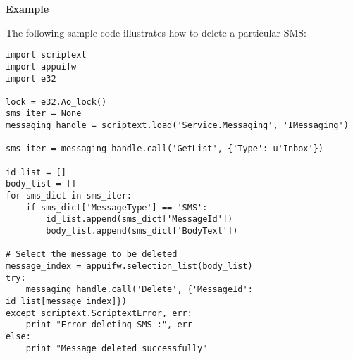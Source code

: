 {\bf Example} \break

The following sample code illustrates how to delete a particular SMS:

\begin{verbatim}
import scriptext
import appuifw
import e32

lock = e32.Ao_lock()
sms_iter = None
messaging_handle = scriptext.load('Service.Messaging', 'IMessaging')

sms_iter = messaging_handle.call('GetList', {'Type': u'Inbox'})

id_list = []
body_list = []
for sms_dict in sms_iter:
    if sms_dict['MessageType'] == 'SMS':
        id_list.append(sms_dict['MessageId'])
        body_list.append(sms_dict['BodyText'])

# Select the message to be deleted
message_index = appuifw.selection_list(body_list)
try:
    messaging_handle.call('Delete', {'MessageId': id_list[message_index]})
except scriptext.ScriptextError, err:
    print "Error deleting SMS :", err
else:
    print "Message deleted successfully"
\end{verbatim}
\pagebreak

